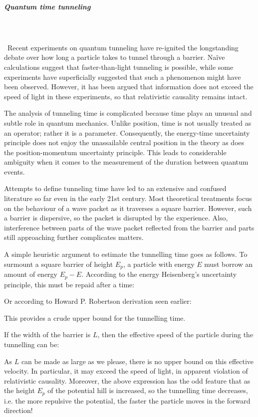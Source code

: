 	\subparagraph{Quantum time tunneling}\mbox{}\\\\\
	 Recent experiments on quantum tunneling have re-ignited the longstanding debate over how long a particle takes to tunnel through a barrier. Naïve calculations suggest that faster-than-light tunneling is possible, while some experiments have superficially suggested that such a phenomenon might have been observed. However, it has been argued that information does not exceed the speed of light in these experiments, so that relativistic causality remains intact.

	The analysis of tunneling time is complicated because time plays an unusual and subtle role in quantum mechanics. Unlike position, time is not usually treated as an operator; rather it is a parameter. Consequently, the energy-time uncertainty principle does not enjoy the unassailable central position in the theory as does the position-momentum uncertainty principle. This leads to considerable ambiguity when it comes to the measurement of the duration between quantum events.

	Attempts to define tunneling time have led to an extensive and confused literature so far even in the early 21st century. Most theoretical treatments focus on the behaviour of a wave packet as it traverses a square barrier. However, such a barrier is dispersive, so the packet is disrupted by the experience. Also, interference between parts of the wave packet reflected from the barrier and parts still approaching further complicates matters.
	
	A simple heuristic argument to estimate the tunnelling time goes as follows. To surmount a square barrier of height $E_p$, a particle with energy $E$ must borrow an amount of energy $E_p-E$. According to the energy Heisenberg's uncertainty principle, this must be repaid after a time:
	
	Or according to Howard P. Robertson derivation seen earlier:
	
	This provides a crude upper bound for the tunnelling time.	
	
	If the width of the barrier is $L$, then the effective speed of the particle during the tunnelling can be:
	
	As $L$ can be made as large as we please, there is no upper bound on this effective velocity. In particular, it may exceed the speed of light, in apparent violation of relativistic causality. Moreover, the above expression has the odd feature that as the height $E_p$ of the potential hill is increased, so the tunnelling time decreases, i.e. the more repulsive the potential, the faster the particle moves in the forward direction!
	
